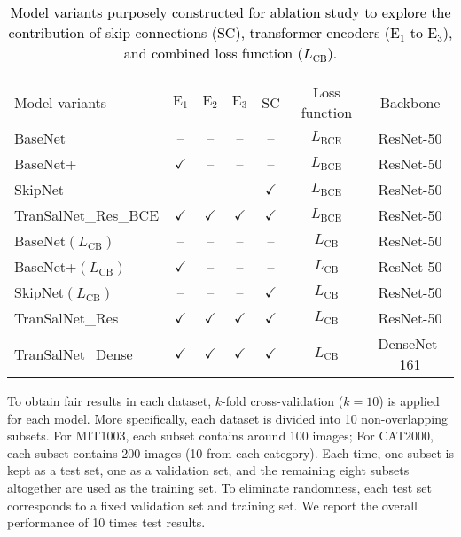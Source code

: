 \documentclass{article}
\begin{document}
\begin{table*}[]
\caption{\textcolor{black}{Model variants purposely constructed for ablation study to explore the contribution of skip-connections (SC),  transformer encoders ($\text{E}_1$ to $\text{E}_3$), and combined loss function ($L_{\text{CB}}$).}}
\label{tb:variants}
\centering

\begin{tabular}{lcccccc}
\hline
& \multicolumn{6}{l}{} \\ \cline{2-7} 
Model variants &  $\text{E}_1$ & $\text{E}_2$  & $\text{E}_3$  & SC  & Loss function  & Backbone \\ \hline
BaseNet & --  &  -- &  -- &  -- & $L_{\text{BCE}}$  & ResNet-50  \\

BaseNet+ & $\checkmark$  & --  &  -- & --  & $L_{\text{BCE}}$  & ResNet-50 \\

SkipNet & --  & --  & --  &  $\checkmark$ & $L_{\text{BCE}}$  & ResNet-50 \\

TranSalNet\_Res\_BCE & $\checkmark$  & $\checkmark$  & $\checkmark$  & $\checkmark$  & $L_{\text{BCE}}$  & ResNet-50 \\

BaseNet$(L_{\text{CB}})$ & --  &  -- &  -- & --  & $L_{\text{CB}}$  & ResNet-50 \\
BaseNet+$(L_{\text{CB}})$ & $\checkmark$  &  -- & --  & --  & $L_{\text{CB}}$  & ResNet-50 \\
SkipNet$(L_{\text{CB}})$ &--   &--   &--   &  $\checkmark$ &  $L_{\text{CB}}$ & ResNet-50 \\

TranSalNet\_Res &  $\checkmark$ & $\checkmark$  &  $\checkmark$ & $\checkmark$ &  $L_{\text{CB}}$ & ResNet-50 \\
TranSalNet\_Dense & $\checkmark$  &  $\checkmark$ & $\checkmark$  &  $\checkmark$ &  $L_{\text{CB}}$ & DenseNet-161 \\ \hline
\end{tabular}

\end{table*}    


To obtain fair results in each dataset, $k$-fold cross-validation ($k=10$) is applied for each model. More specifically, each dataset is divided into 10 non-overlapping subsets. For MIT1003, each subset contains around 100 images; For CAT2000, each subset contains 200 images (10 from each category). Each time, one subset is kept as a test set, one as a validation set, and the remaining eight subsets altogether are used as the training set. To eliminate randomness, each test set corresponds to a fixed validation set and training set. We report the overall performance of 10 times test results.
\end{document}

